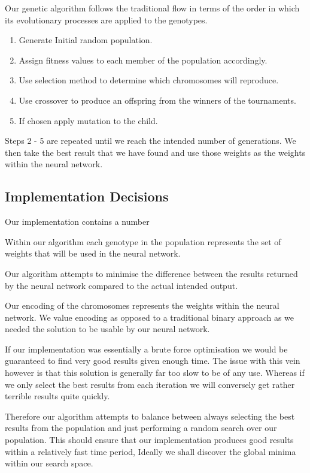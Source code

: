 \documentclass[12pt]{article}
\begin{document}
Our genetic algorithm follows the traditional flow in terms of the order in which its evolutionary processes are applied to the genotypes.

\begin{enumerate}

\item Generate Initial random population.
\item Assign fitness values to each member of the population accordingly.
\item Use selection method to determine which chromosomes will reproduce.
\item Use crossover to produce an offspring from the winners of the tournaments.
\item If chosen apply mutation to the child.
\end{enumerate}

Steps 2 - 5 are repeated until we reach the intended number of generations. We then take the best result that we have found and use those weights as the weights within the neural network.


\subsection{Implementation Decisions}

Our implementation contains a number 

Within our algorithm each genotype in the population represents the set of weights that will be used in the neural network.

Our algorithm attempts to minimise the difference between the results returned by the neural network compared to the actual intended output.

Our encoding of the chromosomes represents the weights within the neural network. We value encoding as opposed to a traditional binary approach as we needed the solution to be usable by our neural network. 

If our implementation was essentially a brute force optimisation we would be guaranteed to find very good results given enough time. The issue with this vein however is that this solution is generally far too slow to be of any use. Whereas if we only select the best results from each iteration we will conversely get rather terrible results quite quickly. 

Therefore our algorithm attempts to balance between always selecting the best results from the population and just performing a random search over our population. This should ensure that our implementation produces good results within a relatively fast time period, Ideally we shall discover the global minima within our search space.
\end{document}
